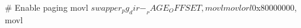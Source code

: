 \documentclass[varwidth=24em,crop]{standalone}
\begin{document}
\begin{gascode}
# Enable paging
movl $swapper_pg_dir - __PAGE_OFFSET, %
movl %
movl %
 orl $0x80000000, %
movl %
\end{gascode}
\end{document}
